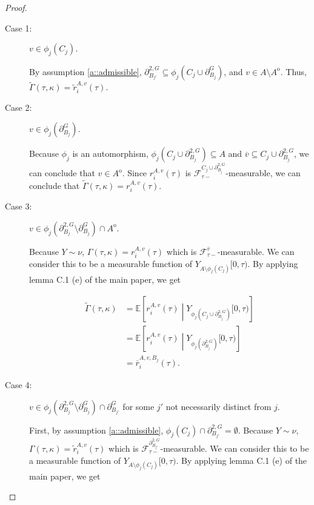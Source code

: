 \documentclass[12pt]{article}
\newcommand{\mb}{\mathbb}
\newcommand{\mc}{\mathcal}
\newcommand{\ov}{\overline}
\newcommand{\ex}[1]{\mb{E}\left[#1\right]}			%
\newcommand{\gneigh}[2]{\partial^{#1}_{#2}}			%
\newcommand{\dgneigh}[2]{\partial^{2,#1}_{#2}}		%
\newcommand{\cl}[1]{\ov{#1}}						%
\newcommand{\rate}{r}								%
\newcommand{\F}{\mc{F}}								%
\newcommand{\vind}[1]{_{#1}}						%
\newcommand{\tme}[1]{(#1)}							%
\newcommand{\tmi}[1]{#1}							%
\newcommand{\vpara}[1]{^{#1}}						%
\newcommand{\stpara}[1]{_{#1}}						%
\newcommand{\tpara}[1]{_{#1}}						%
\newcommand{\gvpara}[2]{^{#1,#2}}					%
\newcommand{\Xg}{Y}									%
\newcommand{\brate}{\alt{\rate}}					%
\newcommand{\inte}[1]{{#1}^\mathrm{o}}				%
\newcommand{\alt}[1]{\tilde{#1}}					%
\newcommand{\rt}{\tau}								%
\renewcommand{\mark}{\kappa}						%
\newcommand{\ratee}{\Gamma}							%
\newcommand{\cratee}{\alt{\ratee}}					%
\newcommand{\mm}{\nu}								%
\newcommand{\bgrate}{\ov{\rate}}					%
\newcommand{\gvjpara}[3]{^{#1,#2,#3}}				%
\begin{document}
\begin{proof}
\begin{description}
\item[Case 1: ] \(v \in \phi_j(C_j)\).

By assumption \ref{a::admissible}, \(\dgneigh{G}{B_{j'}} \subseteq \phi_j(C_j\cup \gneigh{G}{B_j})\), and \(v \in A\setminus\inte{A}\). Thus, \(\cratee(\rt,\mark) = \brate\gvpara{A}{v}\stpara{i}(\rt)\).

\item[Case 2: ] \(v\in \phi_j(\gneigh{G}{B_j})\). 

Because \(\phi_j\) is an automorphism, \(\phi_j\left(C_j\cup\dgneigh{G}{B_j}\right) \subseteq A\) and \(\cl{v} \subseteq C_j\cup\dgneigh{G}{B_j}\), we can conclude that \(v \in \inte{A}\). Since \(\rate\gvpara{A}{v}\stpara{i}(\rt)\) is \(\F\vpara{C_j\cup\dgneigh{G}{B_j}}\tpara{\rt-}\)-measurable, we can conclude that \(\cratee(\rt,\mark) = \rate\gvpara{A}{v}\stpara{i}(\rt)\).

\item[Case 3: ] \(v \in \phi_j(\dgneigh{G}{B_j}\setminus\gneigh{G}{B_j})\cap\inte{A}\).

Because \(\Xg\sim\mm\), \(\ratee(\rt,\mark) = \rate\gvpara{A}{v}\stpara{i}(\rt)\) which is \(\F\vpara{\cl{v}}\tpara{\rt-}\)-measurable. We can consider this to be a measurable function of \(\Xg\vind{A\setminus\phi_j(C_j)}\tmi{[0,\rt)}\). By applying lemma C.1 (e) of the main paper, we get

\begin{align*}
\cratee(\rt,\mark) &= \ex{\rate\gvpara{A}{v}\stpara{i}(\rt)\middle|\Xg\vind{\phi_j\left(C_j\cup\dgneigh{G}{B_j}\right)}\tmi{[0,\rt)}}\\
&= \ex{\rate\gvpara{A}{v}\stpara{i}(\rt)\middle|\Xg\vind{\phi_j\left(\dgneigh{G}{B_j}\right)}\tmi{[0,\rt)}}\\
&= \bgrate\gvjpara{A}{v}{B_j}\stpara{i}\tme{\rt}.
\end{align*}

\item[Case 4: ] \(v \in \phi_j(\dgneigh{G}{B_j}\setminus\gneigh{G}{B_j})\cap \gneigh{G}{B_{j'}}\) for some \(j'\) not necessarily distinct from \(j\).

First, by assumption \ref{a::admissible}, \(\phi_j(C_j)\cap\dgneigh{G}{B_{j'}}= \emptyset\). Because \(\Xg\sim\mm\), \(\ratee(\rt,\mark) = \brate\gvpara{A}{v}\stpara{i}(\rt)\) which is \(\F\vpara{\dgneigh{G}{B_{j'}}}\tpara{\rt-}\)-measurable. We can consider this to be a measurable function of \(\Xg\vind{A\setminus\phi_j(C_j)}\tmi{[0,\rt)}\). By applying lemma C.1 (e) of the main paper, we get


\end{description}
\end{proof}
\end{document}
